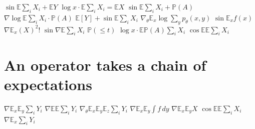 \documentclass{article}
\begin{document}
$\sin\mathbb{E}\sum_i X_i+\mathbb{E}Y$ $\log x\cdot\mathbb{E}\sum_i X_i=\mathbb{E}X$ $\sin\mathbb{E}\sum_i X_i+\mathbb{P}(A)$
$\nabla\log\mathbb{E}\sum_i X_i\cdot\mathbb{P}(A)$ $\mathbb{E}[Y]+\sin\mathbb{E}\sum_i X_i$
$\nabla_\theta\mathbb{E}_x\log\sum_y p_\theta(x,y)$ $\sin\mathbb{E}_x f(x)$ $\nabla\mathbb{E}_x(X)^2!$ $\sin\nabla\mathbb{E}\sum_i X_i$
$\mathbb{P}(\le t)$ $\log x\cdot\mathbb{E}\mathbb{P}(A)\sum_i X_i$ $\cos\mathbb{E}\mathbb{E}\sum_i X_i$
\section{An operator takes a chain of expectations}
$\nabla\mathbb{E}_x\mathbb{E}_y\sum_i Y_i$ $\nabla\mathbb{E}\mathbb{E}\sum_i Y_i$ $\nabla_\theta\mathbb{E}_x\mathbb{E}_y\mathbb{E}_z\sum_i Y_i$
$\nabla\mathbb{E}_x\mathbb{E}_y\int f\,dy$ $\nabla\mathbb{E}_x\mathbb{E}_y X$ $\cos\mathbb{E}\mathbb{E}\sum_i X_i$ $\nabla\mathbb{E}_x\sum_i Y_i$
\end{document}
